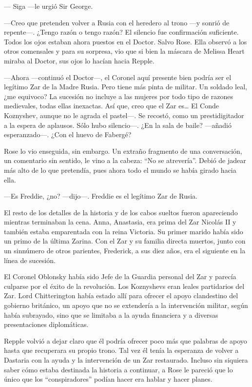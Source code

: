 {--- Siga ---le urgió Sir George.}

{---Creo que pretenden volver a Rusia con el heredero al trono ---y
	sonrió de repente---. ¿Tengo razón o tengo razón? El silencio fue
	confirmación suficiente. Todos los ojos estaban ahora puestos en el
	Doctor. Salvo Rose. Ella observó a los otros comensales y para su
	sorpresa, vio que si bien la máscara de Melissa Heart miraba al Doctor,
sus ojos lo hacían hacia Repple.}

{---Ahora ---continuó el Doctor---, el Coronel aquí presente bien podría
	ser el legítimo Zar de la Madre Rusia. Pero tiene más pinta de militar.
	Un soldado leal, ¿me equivoco? La sucesión no incluye a las mujeres por
	todo tipo de razones medievales, todas ellas inexactas. Así que, creo
	que el Zar es\ldots{} El Conde Koznyshev, aunque no le agrada el
	pastel---. Se recostó, como un prestidigitador a la espera de aplausos.
	Sólo hubo silencio---. ¿En la sala de baile? ---añadió esperanzado---.
¿Con el huevo de Fabergé?}

{Rose lo vio enseguida, sin embargo. Un extraño fragmento de una
	conversación, un comentario sin sentido, le vino a la cabeza: ``No se
	atrevería''. Debió de jadear más alto de lo que pretendía, pues ahora
todo el mundo se había girado hacia ella.}

{---Es Freddie, ¿no? ---dijo---. Freddie es el legítimo Zar de Rusia.}

{El resto de los detalles de la historia y de los cabos sueltos fueron
	apareciendo mientras terminaban la cena. Anna, Anastasia, era prima del
	Zar Nicolás II y también estaba emparentada con la reina Victoria. Su
	primer marido había sido un primo de la última Zarina. Con el Zar y su
	familia directa muertos, junto con un sinnúmero de otros parientes,
Frederick, a sus diez años, era el siguiente en la línea de sucesión.}

{El Coronel Oblonsky había sido Jefe de la Guardia personal del Zar y
	parecía culparse por el éxito de la revolución. Los Koznyshevs eran
	leales partidarios del Zar. Lord Chitterington había estado allí para
	ofrecer el apoyo clandestino del gobierno británico, un apoyo que no se
	extendería a la intervención militar, según había subrayado, sino que se
	limitaba a la ayuda financiera y a diversas presentaciones
diplomáticas.}

{Repple volvió a dejar claro que él podría ofrecer poco más que palabras
	de apoyo hasta que recuperara su propio trono. Tal vez él tenía la
	esperanza de volver a Dastaria con la ayuda y la intervención de un Zar
	restaurado. Incluso sin siquiera saber cómo estaba destinada la historia
	a continuar, a Rose le pareció que lo único que los ``conspiradores''
podían hacer era hablar y hacer planes.}

